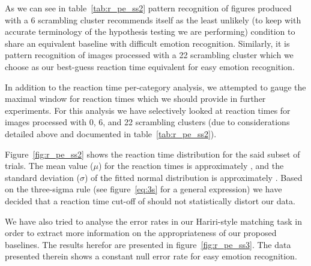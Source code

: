 	    As we can see in table~\ref{tab:r_pe_ss2} pattern recognition of figures produced with a \SI{6}{\pixel} scrambling cluster recommends itself as the least unlikely (to keep with accurate terminology of the hypothesis testing we are performing) condition to share an equivalent baseline with difficult emotion recognition.
	    Similarly, it is pattern recognition of images processed with a \SI{22}{\pixel} scrambling cluster which we choose as our best-guess reaction time equivalent for easy emotion recognition.
	    
	    In addition to the reaction time per-category analysis, we attempted to gauge the maximal window for reaction times which we should provide in further experiments.
	    For this analysis we have selectively looked at reaction times for images processed with \SI{0}{\pixel}, \SI{6}{\pixel}, and \SI{22}{\pixel} scrambling clusters (due to considerations detailed above and documented in table~\ref{tab:r_pe_ss2}).
	    
	    Figure~\ref{fig:r_pe_ss2} shows the reaction time distribution for the said subset of trials.
	    The mean value ($\mu$) for the reaction times is approximately , 
	    and the standard deviation ($\sigma$) of the fitted normal distribution is approximately .
	    Based on the three-sigma rule (see figure~\ref{eq:3s} for a general expression) we have decided that a reaction time cut-off of  should not statistically distort our data.
	    
	    We have also tried to analyse the error rates in our Hariri-style matching task in order to extract more information on the appropriateness of our proposed baselines.
	    The results herefor are presented in figure~\ref{fig:r_pe_ss3}.
	    The data presented therein shows a constant null error rate for easy emotion recognition.
	    
